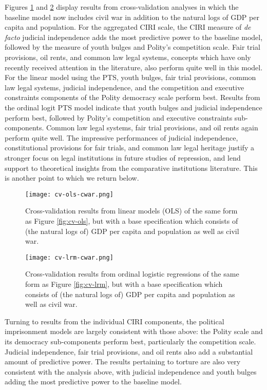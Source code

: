 \documentclass[12pt]{article}
\begin{document}
Figures \ref{fig:cv-ols-cwar} and \ref{fig:cv-lrm-cwar} display results from cross-validation analyses in which the baseline model now includes civil war in addition to the natural logs of GDP per capita and population. For the aggregated CIRI scale, the CIRI measure of {\it de facto} judicial independence adds the most predictive power to the baseline model, followed by the measure of youth bulges and Polity's competition scale. Fair trial provisions, oil rents, and common law legal systems, concepts which have only recently received attention in the literature, also perform quite well in this model. For the linear model using the PTS, youth bulges, fair trial provisions, common law legal systems, judicial independence, and the competition and executive constraints components of the Polity democracy scale perform best. Results from the ordinal logit PTS model indicate that youth bulges and judicial independence perform best, followed by Polity's competition  and executive constraints sub-components. Common law legal systems, fair trial provisions, and oil rents again perform quite well. The impressive performances of  judicial independence, constitutional provisions for fair trials, and common law legal heritage justify a stronger focus on legal institutions in future studies of repression, and lend support to theoretical insights from the comparative institutions literature. This is another point to which we return below.

\begin{figure}[!htpb]
\centering
\texttt{[image: cv-ols-cwar.png]}
\caption{Cross-validation results from linear models (OLS) of the same form as Figure \ref{fig:cv-ols}, but with a base specification which consists of (the natural logs of) GDP per capita and population as well as civil war.}
\label{fig:cv-ols-cwar}
\end{figure}

\begin{figure}[!htpb]
\centering
\texttt{[image: cv-lrm-cwar.png]}
\caption{Cross-validation results from ordinal logistic regressions of the same form as Figure \ref{fig:cv-lrm}, but with a base specification which consists of (the natural logs of) GDP per capita and population as well as civil war.}
\label{fig:cv-lrm-cwar}
\end{figure}

Turning to results from the individual CIRI components, the political imprisonment models are largely consistent with those above: the Polity scale and its democracy sub-components perform best, particularly the competition scale. Judicial independence, fair trial provisions, and oil rents also add a substantial amount of predictive power. The results pertaining to torture are also very consistent with the analysis above, with judicial independence and youth bulges adding the most predictive power to the baseline model. 
\end{document}
